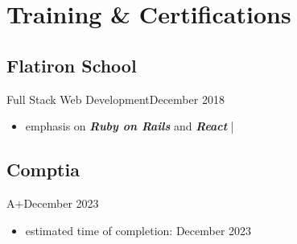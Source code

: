 \section{Training \& Certifications} 
\subsection{Flatiron School}{Full Stack Web Development}{December 2018}
\begin{itemize}
    \item emphasis on \textbf{\emph{Ruby on Rails}} and \textbf{\emph{React}} | 
\end{itemize}

\subsection{Comptia}{A+}{December 2023}
\begin{itemize}
    \item estimated time of completion: December 2023
\end{itemize}


